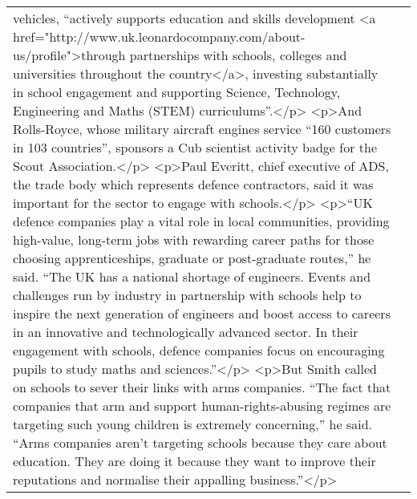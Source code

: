 \documentclass[]{article}
\begin{document}
\begin{table}[!h]
{\begin{tabular}[t]{ll}
vehicles, “actively supports education and skills development <a href="http://www.uk.leonardocompany.com/about-us/profile">through partnerships with schools, colleges and universities throughout the country</a>, investing substantially in school engagement and supporting Science, Technology, Engineering and Maths (STEM) curriculums”.</p> <p>And Rolls-Royce, whose military aircraft engines service “160 customers in 103 countries”, sponsors a Cub scientist activity badge for the Scout Association.</p> <p>Paul Everitt, chief executive of ADS, the trade body which represents defence contractors, said it was important for the sector to engage with schools.</p> <p>“UK defence companies play a vital role in local communities, providing high-value, long-term jobs with rewarding career paths for those choosing apprenticeships, graduate or post-graduate routes,” he said. “The UK has a national shortage of engineers. Events and challenges run by industry in partnership with schools help to inspire the next generation of engineers and boost access to careers in an innovative and technologically advanced sector. In their engagement with schools, defence companies focus on encouraging pupils to study maths and sciences.”</p> <p>But Smith called on schools to sever their links with arms companies. “The fact that companies that arm and support human-rights-abusing regimes are targeting such young children is extremely concerning,” he said. “Arms companies aren’t targeting schools because they care about education. They are doing it because they want to improve their reputations and normalise their appalling business.”</p>\\

\end{tabular}}
\end{table}
\end{document}
